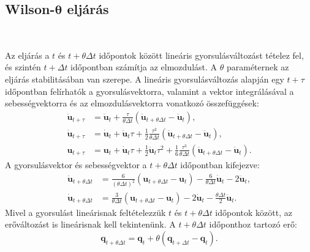 \subsection{Wilson-$\boldsymbol\theta$ eljárás}

{\ }

Az eljárás a $t$ és $t+\theta\Delta{t}$ időpontok között lineáris gyorsulásváltozást tételez fel, és szintén $t+\Delta{t}$ időpontban számítja az elmozdulást. A $\theta$ paraméternek az eljárás stabilitásában van szerepe.
A lineáris gyorsulásváltozás alapján egy $t+\tau$ időpontban felírhatók a gyorsulásvektorra, valamint a vektor integrálásával a sebességvektorra és az elmozdulásvektorra  vonatkozó összefüggések:
\begin{subequations}
\begin{align}
\mathbf{\ddot{u}}_{t+\tau} & = \mathbf{\ddot{u}}_{t}+\frac{\tau}{\theta\Delta{t}}\left(\mathbf{\ddot{u}}_{t+\theta\Delta{t}}-\mathbf{\ddot{u}}_t\right), \label{wilson_tau1}\\
\mathbf{\dot{u}}_{t+\tau} & = \mathbf{\dot{u}}_t+\mathbf{\ddot{u}}_t\tau+\frac{1}{2}\frac{\tau^2}{\theta\Delta{t}}\left(\mathbf{\ddot{u}}_{t+\theta\Delta{t}}-\mathbf{\ddot{u}}_t\right), \label{wilson_tau2}\\
\mathbf{u}_{t+\tau} & = \mathbf{u}_t+\mathbf{\dot{u}}_t\tau+\frac{1}{2}\mathbf{\ddot{u}}_t\tau^2+\frac{1}{6}\frac{\tau^3}{\theta\Delta{t}}\left(\mathbf{\ddot{u}}_{t+\theta\Delta{t}}-\mathbf{\ddot{u}}_t\right).\label{wilson_tau3}
\end{align}
\end{subequations}
A gyorsulásvektor és sebességvektor a $t+\theta\Delta{t}$ időpontban kifejezve:  
\begin{subequations}
\begin{align}
\mathbf{\ddot{u}}_{t+\theta\Delta{t}} & = \frac{6}{(\theta\Delta{t})^2}\left(\mathbf{u}_{t+\theta\Delta{t}}-\mathbf{u}_t\right)-\frac{6}{\theta\Delta{t}}\mathbf{\dot{u}}_t-2\mathbf{\ddot{u}}_t, \label{wilson theta a}\\
\mathbf{\dot{u}}_{t+\theta\Delta{t}} & = \frac{3}{\theta\Delta{t}}\left(\mathbf{u}_{t+\theta\Delta{t}}-\mathbf{u}_t\right)-2\mathbf{\dot{u}}_t-\frac{\theta\Delta{t}}{2} \mathbf{\ddot{u}}_t. \label{wilson theta v}
\end{align}
\end{subequations}
%
Mivel a gyorsulást lineárisnak feltételezzük $t$ és $t+\theta\Delta{t}$ időpontok között, az erőváltozást is lineárisnak kell tekintenünk. A $t+\theta\Delta{t}$ időponthoz tartozó erő:
\begin{equation*}
\mathbf{q}_{t+\theta\Delta{t}} = \mathbf{q}_t+\theta\left(\mathbf{q}_{t+\Delta{t}}-\mathbf{q}_t\right). 
\end{equation*}
